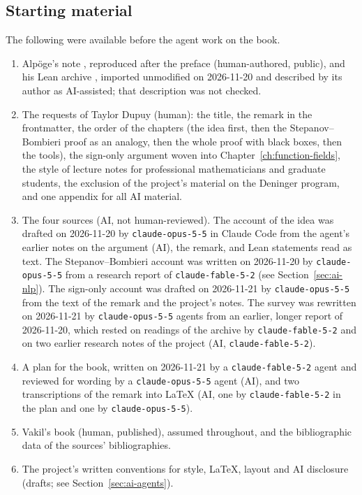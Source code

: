 \documentclass[11pt]{amsbook}
\theoremstyle{plain}
\theoremstyle{definition}
\theoremstyle{remark}
\numberwithin{equation}{section}
\numberwithin{figure}{chapter}
\numberwithin{table}{chapter}
\begin{document}
\subsection*{Starting material}
The following were available before the agent work on the book.
\begin{enumerate}[label=(\alph*)]
\item Alp\"oge's note \cite{AlpogeRemark2026}, reproduced after the
preface (human-authored, public), and his Lean archive
\cite[\href{https://alpo.ge/}{home page}]{AlpogeArchive2026}, imported
unmodified on 2026-11-20 and described by its author as AI-assisted;
that description was not checked.
\item The requests of Taylor Dupuy (human): the title, the remark in
the frontmatter, the order of the chapters (the idea first, then the
Stepanov--Bombieri proof as an analogy, then the whole proof with
black boxes, then the tools), the sign-only argument woven into
Chapter~\ref{ch:function-fields}, the style of lecture notes for
professional mathematicians and graduate students, the exclusion of
the project's material on the Deninger program, and one appendix for
all AI material.
\item The four sources (AI, not human-reviewed). The account of the
idea was drafted on 2026-11-20 by \texttt{claude-opus-5-5} in Claude
Code from the agent's earlier notes on the argument (AI), the remark,
and Lean statements read as text. The Stepanov--Bombieri account was
written on 2026-11-20 by \texttt{claude-opus-5-5} from a research report
of \texttt{claude-fable-5-2} (see Section~\ref{sec:ai-nlp}). The
sign-only account was drafted on 2026-11-21 by \texttt{claude-opus-5-5}
from the text of the remark and the project's notes. The survey was
rewritten on 2026-11-21 by \texttt{claude-opus-5-5} agents from an
earlier, longer report of 2026-11-20, which rested on readings of the
archive by \texttt{claude-fable-5-2} and on two earlier research notes
of the project (AI, \texttt{claude-fable-5-2}).
\item A plan for the book, written on 2026-11-21 by a
\texttt{claude-fable-5-2} agent and reviewed for wording by a
\texttt{claude-opus-5-5} agent (AI), and two transcriptions of the
remark into \LaTeX{} (AI, one by \texttt{claude-fable-5-2} in the plan
and one by \texttt{claude-opus-5-5}).
\item Vakil's book \cite{Vakil2025} (human, published), assumed
throughout, and the bibliographic data of the sources' bibliographies.
\item The project's written conventions for style, \LaTeX{}, layout
and AI disclosure (drafts; see Section~\ref{sec:ai-agents}).
\end{enumerate}
\end{document}
